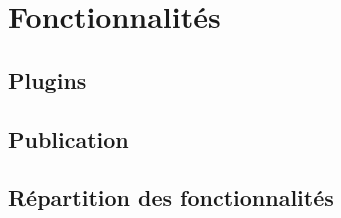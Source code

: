 \documentclass[11pt]{report}
\begin{document}




















\chapter{Fonctionnalités}

	\section{Plugins}
	\section{Publication}
	\section{Répartition des fonctionnalités}
\end{document}
